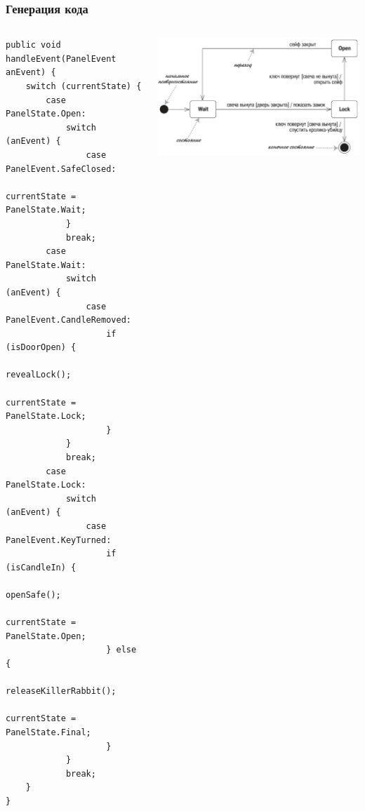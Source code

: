 \documentclass{../mcsslides}
\begin{document}
    \begin{frame}[fragile]
        \frametitle{Генерация кода}
        \begin{columns}
            \begin{column}{0.5\textwidth}
                \begin{tiny}
                    \begin{verbatim}
public void handleEvent(PanelEvent anEvent) {
    switch (currentState) {
        case PanelState.Open:
            switch (anEvent) {
                case PanelEvent.SafeClosed:
                    currentState = PanelState.Wait;
            }
            break;
        case PanelState.Wait:
            switch (anEvent) {
                case PanelEvent.CandleRemoved:
                    if (isDoorOpen) {
                        revealLock();
                        currentState = PanelState.Lock;
                    }
            }
            break;
        case PanelState.Lock:
            switch (anEvent) {
                case PanelEvent.KeyTurned:
                    if (isCandleIn) {
                        openSafe();
                        currentState = PanelState.Open;
                    } else {
                        releaseKillerRabbit();
                        currentState = PanelState.Final;
                    }
            }
            break;
    }
}
                    \end{verbatim}
                \end{tiny}
            \end{column}
            \begin{column}{0.5\textwidth}
                \begin{center}
                    \includegraphics[width=\textwidth]{stateTransitionSyntax.png}
                \end{center}
            \end{column}
        \end{columns}
    \end{frame}
\end{document}
